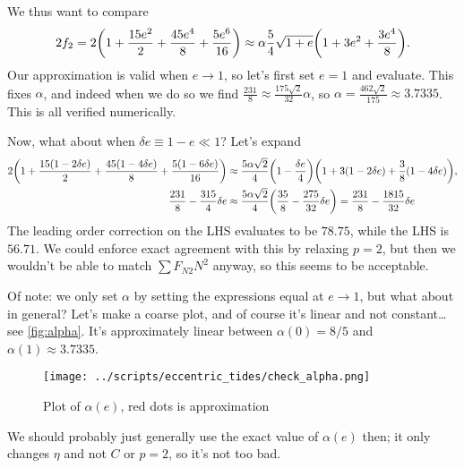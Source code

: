 \documentclass[11pt,
        usenames, %
        dvipsnames %
    ]{article}
\DeclarePairedDelimiter\p{\lparen}{\rparen}
\begin{document}
We thus want to compare
\begin{equation}
    2f_2 = 2\p*{1 + \frac{15 e^2}{2} + \frac{45e^4}{8} + \frac{5e^6}{16}}
        \approx \alpha\frac{5}{4}\sqrt{1 + e}
            \p*{1 + 3e^2 + \frac{3e^4}{8}}.
\end{equation}
Our approximation is valid when $e \to 1$, so let's first set $e = 1$ and
evaluate. This fixes $\alpha$, and indeed when we do so we find $\frac{231}{8}
\approx \frac{175\sqrt{2}}{32}\alpha$, so $\alpha = \frac{462\sqrt{2}}{175}
\approx 3.7335$. This is all verified numerically.

Now, what about when $\delta e \equiv 1 - e \ll 1$? Let's expand
\begin{align}
    2 \p*{1
            + \frac{15\p*{1 - 2\delta e}}{2}
            + \frac{45\p*{1 - 4\delta e}}{8}
            + \frac{5\p*{1 - 6\delta e}}{16}}
        &\approx
            \frac{5\alpha \sqrt{2}}{4} \p*{1 - \frac{\delta e}{4}} \p*{
                    1 + 3\p*{1 - 2\delta e} + \frac{3}{8}
                        \p*{1 - 4\delta e}
                },\\
    \frac{231}{8} - \frac{315}{4}\delta e
        &\approx \frac{5\alpha\sqrt{2}}{4}\p*{
            \frac{35}{8} - \frac{275}{32} \delta e}
            = \frac{231}{8} - \frac{1815}{32}\delta e
\end{align}
The leading order correction on the LHS evaluates to be $78.75$, while the LHS
is $56.71$. We could enforce exact agreement with this by relaxing $p = 2$, but
then we wouldn't be able to match $\sum\limits F_{N2}N^2$ anyway, so this seems
to be acceptable.

Of note: we only set $\alpha$ by setting the expressions equal at $e \to 1$, but
what about in general? Let's make a coarse plot, and of course it's linear and
not constant\dots see \autoref{fig:alpha}. It's approximately linear between
$\alpha(0) = 8/5$ and $\alpha(1) \approx 3.7335$.
\begin{figure}[h]
    \centering
    \texttt{[image: ../scripts/eccentric\_tides/check\_alpha.png]}
    \caption{Plot of $\alpha(e)$, red dots is approximation}\label{fig:alpha}
\end{figure}
We should probably just generally use the exact value of $\alpha(e)$ then; it
only changes $\eta$ and not $C$ or $p = 2$, so it's not too bad.
\end{document}
